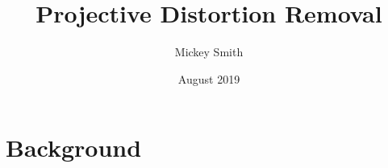 \documentclass{article}
\title{Projective Distortion Removal}
\author{Mickey Smith}
\date{August 2019}
\begin{document}
\maketitle

\section{Background}

\alpha
\end{document}
